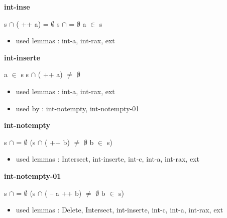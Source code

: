 \documentclass[a4paper]{article}
\begin{document}
\medskip

\bigskip

{\large\bf int-inse}

\medskip

 \Fol s $\cap$ ( ++ a) = $\emptyset$ \Imp s $\cap$  = $\emptyset$ \And \Not a $\in$ s

\begin{itemize}


\item       used lemmas  : int-a, int-rax, ext

\end{itemize}

\medskip

\bigskip

{\large\bf int-inserte}

\medskip

 \Fol a $\in$ s \Imp s $\cap$ ( ++ a) $\neq$ $\emptyset$

\begin{itemize}


\item       used lemmas  : int-a, int-rax, ext
\item       used by      : int-notempty, int-notempty-01

\end{itemize}

\medskip

\bigskip

{\large\bf int-notempty}

\medskip

 \Fol s $\cap$  = $\emptyset$ \Imp (s $\cap$ ( ++ b) $\neq$ $\emptyset$ \Equiv b $\in$ s)

\begin{itemize}


\item       used lemmas  : Intersect, int-inserte, int-c, int-a, int-rax, ext

\end{itemize}

\medskip

\bigskip

{\large\bf int-notempty-01}

\medskip

 \Fol s $\cap$  = $\emptyset$ \Imp (s $\cap$ ( -- a ++ b) $\neq$ $\emptyset$ \Equiv b $\in$ s)

\begin{itemize}


\item       used lemmas  : Delete, Intersect, int-inserte, int-c, int-a, int-rax, ext

\end{itemize}
\end{document}
